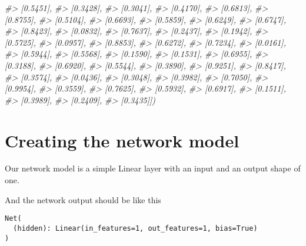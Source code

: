 \documentclass[]{book}
\newenvironment{Shaded}{\begin{snugshade}}{\end{snugshade}}
\newcommand{\CommentTok}[1]{\textcolor[rgb]{0.56,0.35,0.01}{\textit{#1}}}
\begin{document}
\begin{Shaded}
\begin{Highlighting}[]
\CommentTok{#>         [0.5451],}
\CommentTok{#>         [0.3428],}
\CommentTok{#>         [0.3041],}
\CommentTok{#>         [0.4170],}
\CommentTok{#>         [0.6813],}
\CommentTok{#>         [0.8755],}
\CommentTok{#>         [0.5104],}
\CommentTok{#>         [0.6693],}
\CommentTok{#>         [0.5859],}
\CommentTok{#>         [0.6249],}
\CommentTok{#>         [0.6747],}
\CommentTok{#>         [0.8423],}
\CommentTok{#>         [0.0832],}
\CommentTok{#>         [0.7637],}
\CommentTok{#>         [0.2437],}
\CommentTok{#>         [0.1942],}
\CommentTok{#>         [0.5725],}
\CommentTok{#>         [0.0957],}
\CommentTok{#>         [0.8853],}
\CommentTok{#>         [0.6272],}
\CommentTok{#>         [0.7234],}
\CommentTok{#>         [0.0161],}
\CommentTok{#>         [0.5944],}
\CommentTok{#>         [0.5568],}
\CommentTok{#>         [0.1590],}
\CommentTok{#>         [0.1531],}
\CommentTok{#>         [0.6955],}
\CommentTok{#>         [0.3188],}
\CommentTok{#>         [0.6920],}
\CommentTok{#>         [0.5544],}
\CommentTok{#>         [0.3890],}
\CommentTok{#>         [0.9251],}
\CommentTok{#>         [0.8417],}
\CommentTok{#>         [0.3574],}
\CommentTok{#>         [0.0436],}
\CommentTok{#>         [0.3048],}
\CommentTok{#>         [0.3982],}
\CommentTok{#>         [0.7050],}
\CommentTok{#>         [0.9954],}
\CommentTok{#>         [0.3559],}
\CommentTok{#>         [0.7625],}
\CommentTok{#>         [0.5932],}
\CommentTok{#>         [0.6917],}
\CommentTok{#>         [0.1511],}
\CommentTok{#>         [0.3989],}
\CommentTok{#>         [0.2409],}
\CommentTok{#>         [0.3435]])}
\end{Highlighting}
\end{Shaded}

\hypertarget{creating-the-network-model}{%
\section{Creating the network model}\label{creating-the-network-model}}

Our network model is a simple Linear layer with an input and an output shape of one.

And the network output should be like this

\begin{verbatim}
Net(
  (hidden): Linear(in_features=1, out_features=1, bias=True)
)
\end{verbatim}
\end{document}

